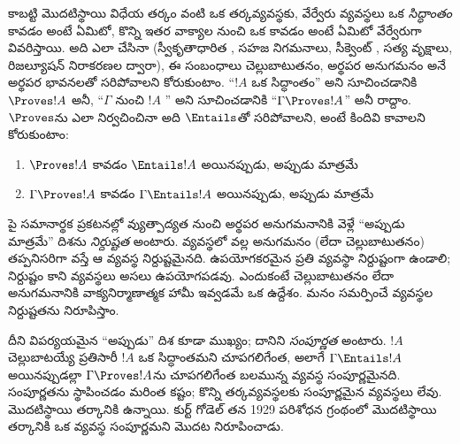 \documentclass[../../../include/open-logic-section]{subfiles}
\begin{document}
కాబట్టి మొదటిస్థాయి విధేయ తర్కం వంటి ఒక తర్కవ్యవస్థకు, వేర్వేరు
 వ్యవస్థలు ఒక 
\emph{సిద్ధాంతం} కావడం అంటే ఏమిటో, కొన్ని ఇతర వాక్యాల నుంచి
ఒక   కావడం అంటే ఏమిటో వేర్వేరుగా
వివరిస్తాయి. అది ఎలా చేసినా (స్వీకృతాధారిత , సహజ
నిగమనాలు, సీక్వెంట్ , సత్య వృక్షాలు, రిజల్యూషన్
నిరాకరణల ద్వారా), ఈ సంబంధాలు చెల్లుబాటుతనం, అర్థపర అనుగమనం అనే
అర్థపర భావనలతో సరిపోవాలని కోరుకుంటాం. “$!A$ ఒక సిద్ధాంతం” అని
సూచించడానికి $\Proves !A$ అనీ, “$\Gamma$ నుంచి $!A$
” అని సూచించడానికి “$\Gamma \Proves !A$” అనీ రాద్దాం.
$\Proves$ను ఎలా నిర్వచించినా అది $\Entails$తో సరిపోవాలని, అంటే
కిందివి కావాలని కోరుకుంటాం:
\begin{enumerate}
\item $\Proves !A$ కావడం $\Entails !A$ అయినప్పుడు, అప్పుడు మాత్రమే
\item $\Gamma \Proves !A$ కావడం $\Gamma \Entails !A$ అయినప్పుడు,
  అప్పుడు మాత్రమే
\end{enumerate}
పై సమానార్థక ప్రకటనల్లో వ్యుత్పాద్యత నుంచి అర్థపర అనుగమనానికి వెళ్లే
“అప్పుడు మాత్రమే” దిశను \emph{నిర్దుష్టత} అంటారు.
 వ్యవస్థలో  వల్ల అనుగమనం (లేదా
చెల్లుబాటుతనం) తప్పనిసరిగా వస్తే ఆ వ్యవస్థ నిర్దుష్టమైనది. ఉపయోగకరమైన
ప్రతి  వ్యవస్థా నిర్దుష్టంగా ఉండాలి; నిర్దుష్టం కాని
 వ్యవస్థలు అసలు ఉపయోగపడవు. ఎందుకంటే చెల్లుబాటుతనం
లేదా అనుగమనానికి వాక్యనిర్మాణాత్మక హామీ ఇవ్వడమే ఒక
 ఉద్దేశం. మనం సమర్పించే 
వ్యవస్థల నిర్దుష్టతను నిరూపిస్తాం.

దీని విపర్యయమైన “అప్పుడు” దిశ కూడా ముఖ్యం; దానిని
\emph{సంపూర్ణత} అంటారు. $!A$ చెల్లుబాటయ్యే ప్రతిసారీ $!A$ ఒక
సిద్ధాంతమని చూపగలిగేంత, అలాగే $\Gamma \Entails !A$ అయినప్పుడల్లా
$\Gamma \Proves !A$ను చూపగలిగేంత బలమున్న  వ్యవస్థ
సంపూర్ణమైనది. సంపూర్ణతను స్థాపించడం మరింత కష్టం; కొన్ని
తర్కవ్యవస్థలకు సంపూర్ణమైన  వ్యవస్థలు లేవు. మొదటిస్థాయి
తర్కానికి ఉన్నాయి. కుర్ట్ గోడెల్ తన 1929 పరిశోధన గ్రంథంలో మొదటిస్థాయి
తర్కానికి ఒక  వ్యవస్థ సంపూర్ణమని మొదట నిరూపించాడు.
\end{document}
